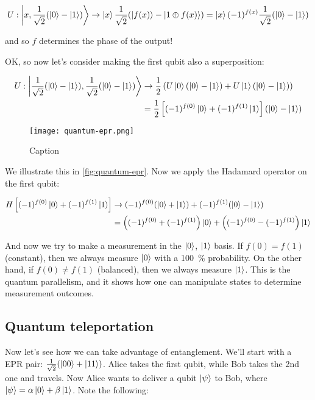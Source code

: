 \documentclass[12pt, english]{book}
\begin{document}
\[ U: \ket{x, \frac{1}{\sqrt{2}} (\ket{0} - \ket{1})} \rightarrow \ket{x} \frac{1}{\sqrt{2}} (\ket{f(x)} - \ket{1 \oplus f(x)}) = \ket{x} (-1)^{f(x)} \frac{1}{\sqrt{2}} ( \ket{0} - \ket{1} )\]

and so $f$ determines the phase of the output! 

OK, so now let's consider making the first qubit also a superposition:

\begin{align*}
	U: \ket{\frac{1}{\sqrt{2}} (\ket{0} - \ket{1}), \frac{1}{\sqrt{2}} (\ket{0} - \ket{1})} &\rightarrow 
	\frac{1}{2} \left( U \ket{0} (\ket{0} - \ket{1}) + U \ket{1} (\ket{0} - \ket{1}) \right) \\
	&= \frac{1}{2} \left[ (-1)^{f(0)} \ket{0} + (-1)^{f(1)} \ket{1} \right]  (\ket{0} - \ket{1}) \\
\end{align*}

\begin{figure}[!ht]
	\centering
	\texttt{[image: quantum-epr.png]}
	\caption{Caption}
	\label{fig:quantum-epr}
\end{figure}

We illustrate this in \autoref{fig:quantum-epr}.
Now we apply the Hadamard operator on the first qubit:

\begin{align*}
	H \left[ (-1)^{f(0)} \ket{0} + (-1)^{f(1)} \ket{1} \right] &\rightarrow
	(-1)^{f(0)} (\ket{0} + \ket{1}) + (-1)^{f(1)} (\ket{0} - \ket{1}) \\
	&= \left( (-1)^{f(0)} + (-1)^{f(1)} \right) \ket{0} + \left( (-1)^{f(0)} - (-1)^{f(1)} \right) \ket{1}
\end{align*}

And now we try to make a measurement in the $\ket{0}$, $\ket{1}$ basis. 
If $f(0) = f(1)$ (constant), then we always measure $\ket{0}$ with a \SI{100}{\percent} probability.
On the other hand, if $f(0) \neq f(1)$ (balanced), then we always measure $\ket{1}$.
This is the quantum parallelism, and it shows how one can manipulate states to determine measurement outcomes. 

\subsection{Quantum teleportation}

Now let's see how we can take advantage of entanglement. 
We'll start with a EPR pair: $\frac{1}{\sqrt{2}} (\ket{00} + \ket{11})$.
Alice takes the first qubit, while Bob takes the 2nd one and travels.
Now Alice wants to deliver a qubit $\ket{\psi}$ to Bob, where $\ket{\psi} = \alpha \ket{0} + \beta \ket{1}$.
Note the following:
\end{document}
